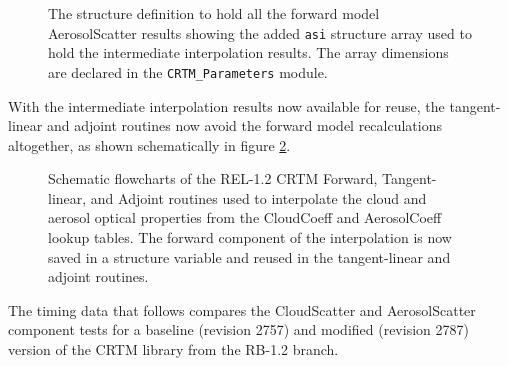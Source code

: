 \begin{figure}[htp]
  \centering
  \caption{The structure definition to hold all the forward model AerosolScatter results showing the added \texttt{asi} structure array used to hold the intermediate interpolation results. The array dimensions are declared in the \texttt{CRTM\_Parameters} module.}
  \label{fig:ASVariables_structure}
\end{figure}

With the intermediate interpolation results now available for reuse, the tangent-linear and adjoint routines now avoid the forward model recalculations altogether, as shown schematically in figure \ref{fig:AtmScatter_Interpolation.new}.

\begin{figure}[htp]
  \centering
  
  \caption{Schematic flowcharts of the REL-1.2 CRTM Forward, Tangent-linear, and Adjoint routines used to interpolate the cloud and aerosol optical properties from the CloudCoeff and AerosolCoeff lookup tables. The forward component of the interpolation is now saved in a structure variable and reused in the tangent-linear and adjoint routines.}
  \label{fig:AtmScatter_Interpolation.new}
\end{figure}

The timing data that follows compares the CloudScatter and AerosolScatter component tests for a baseline (revision 2757) and modified (revision 2787) version of the CRTM library from the RB-1.2 branch.
